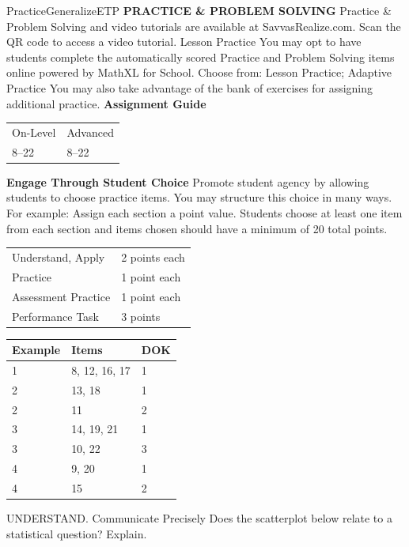 \documentclass{article}
\newenvironment{item-analysis}{}{}      %
\newenvironment{practice}[2]{}{}        %
\newenvironment{te-addendum}[2]{}{}     %
\newcommand{\answer}[1]{}               %
\newcommand{\placeholder}[2]{}          %
\begin{document}
\begin{te-addendum}{Practice}{GeneralizeETP}
\textbf{PRACTICE \& PROBLEM SOLVING}
Practice \& Problem Solving and video tutorials are available at SavvasRealize.com.
Scan the QR code to access a video tutorial.
Lesson Practice You may opt to have students complete the automatically scored Practice and Problem Solving items online powered by MathXL for School.
Choose from: Lesson Practice; Adaptive Practice
You may also take advantage of the bank of exercises for assigning additional practice.
\textbf{Assignment Guide}
\begin{tabular}{ll}
On-Level & Advanced \\
8--22 & 8--22 \\
\end{tabular}
\textbf{Engage Through Student Choice}
Promote student agency by allowing students to choose practice items. You may structure this choice in many ways. For example:
Assign each section a point value. Students choose at least one item from each section and items chosen should have a minimum of 20 total points.
\begin{tabular}{ll}
Understand, Apply & 2 points each \\
Practice & 1 point each \\
Assessment Practice & 1 point each \\
Performance Task & 3 points \\
\end{tabular}
\end{te-addendum}
\begin{item-analysis}
\begin{tabular}{lll}
\toprule
Example & Items & DOK \\
\midrule
1 & 8, 12, 16, 17 & 1 \\
2 & 13, 18 & 1 \\
2 & 11 & 2 \\
3 & 14, 19, 21 & 1 \\
3 & 10, 22 & 3 \\
4 & 9, 20 & 1 \\
4 & 15 & 2 \\
\bottomrule
\end{tabular}
\end{item-analysis}
\begin{practice}{8}{1}
UNDERSTAND. Communicate Precisely Does the scatterplot below relate to a statistical question? Explain.
\placeholder{graph}{Hours of Studying. Red filled scatter points approximately (1,0),(2,0),(4,0),(5,1),(7,1),(8,1),(8,6),(9,3.5),(10,2),(10,3),(11,3),(12,3),(14,2.5),(14,8),(15,4),(15,4.5),(16,4),(16,5),(17,8),(18,15),(19,10),(19,14),(20,12). Horizontal Student Age (years), labels 0,5,10,15,20, grid every 2.5; vertical Study Time (hours), labels 0,5,10,15, grid every 5 with top at 20. Positive-axis arrows.}
\answer{Yes; this is a scatter plot that represents the answers given by students of different ages to a question about the number of hours spent studying.}
\end{practice}
\end{document}
